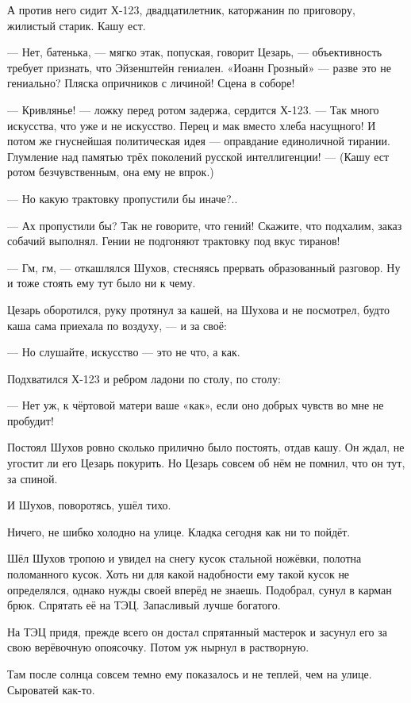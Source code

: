 А против него сидит Х-123, двадцатилетник, каторжанин по приговору, жилистый старик. Кашу ест.

--- Нет, батенька, --- мягко этак, попуская, говорит Цезарь, --- объективность требует признать,
что Эйзенштейн гениален. «Иоанн Грозный» --- разве это не гениально? Пляска опричников с
личиной! Сцена в соборе!

--- Кривлянье! --- ложку перед ротом задержа, сердится Х-123. --- Так много искусства, что уже и не
искусство. Перец и мак вместо хлеба насущного! И потом же гнуснейшая политическая идея ---
оправдание единоличной тирании. Глумление над памятью трёх поколений русской
интеллигенции! --- (Кашу ест ротом безчувственным, она ему не впрок.)

--- Но какую трактовку пропустили бы иначе?..

--- Ах пропустили бы? Так не говорите, что гений! Скажите, что подхалим, заказ собачий выполнял.
Гении не подгоняют трактовку под вкус тиранов!

--- Гм, гм, --- откашлялся Шухов, стесняясь прервать образованный разговор. Ну и тоже стоять ему
тут было ни к чему.

Цезарь оборотился, руку протянул за кашей, на Шухова и не посмотрел, будто каша сама приехала
по воздуху, --- и за своё:

--- Но слушайте, искусство --- это не что, а как.

Подхватился Х-123 и ребром ладони по столу, по столу:

--- Нет уж, к чёртовой матери ваше «как», если оно добрых чувств во мне не пробудит!

Постоял Шухов ровно сколько прилично было постоять, отдав кашу. Он ждал, не угостит ли его
Цезарь покурить. Но Цезарь совсем об нём не помнил, что он тут, за спиной.

И Шухов, поворотясь, ушёл тихо.

Ничего, не шибко холодно на улице. Кладка сегодня как ни то пойдёт.

Шёл Шухов тропою и увидел на снегу кусок стальной ножёвки, полотна поломанного кусок. Хоть
ни для какой надобности ему такой кусок не определялся, однако нужды своей вперёд не знаешь.
Подобрал, сунул в карман брюк. Спрятать её на ТЭЦ. Запасливый лучше богатого.

На ТЭЦ придя, прежде всего он достал спрятанный мастерок и засунул его за свою верёвочную
опоясочку. Потом уж нырнул в растворную.

Там после солнца совсем темно ему показалось и не теплей, чем на улице. Сыроватей как-то.

